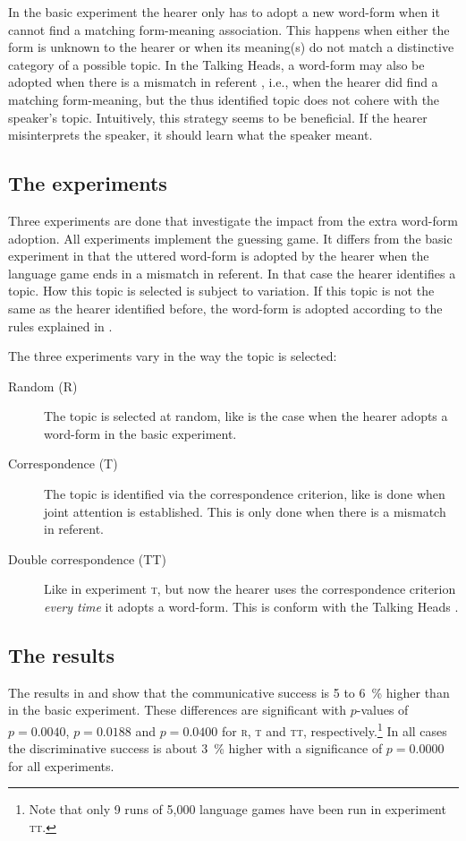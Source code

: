 In the basic experiment the hearer only has to adopt a new word-form when it cannot find a matching form-meaning association. This happens when either the form is unknown to the hearer or when its meaning(s) do not match a distinctive category of a possible topic. In the Talking Heads, a word-form may also be adopted when there is a mismatch in referent \citep{steels:2000}, i.e., when the hearer did find a matching form-meaning, but the thus identified topic does not cohere with the speaker's topic. Intuitively, this strategy seems to be beneficial. If the hearer misinterprets the speaker, it should learn what the speaker meant.

\subsection{The experiments}

Three experiments are done that investigate the impact from the extra word-form adoption. All experiments implement the guessing game. It differs from the basic experiment in that the uttered word-form is adopted by the hearer when the language game ends in a mismatch in referent. In that case the hearer identifies a topic. How this topic is selected is subject to variation. If this topic is not the same as the hearer identified before, the word-form is adopted according to the rules explained in .

The three experiments vary in the way the topic is selected:

\begin{description}
\item[Random (R)] The topic is selected at random, like is the case when the hearer adopts a word-form in the basic experiment.

\item[Correspondence (T)] The topic is identified via the correspondence criterion, like is done when joint attention is established. This is only done when there is a mismatch in referent.

\item[Double correspondence (TT)] Like in experiment {\scshape t}, but now the hearer uses the correspondence criterion {\em every time} it adopts a word-form. This is conform with the Talking Heads \citep{steels:2000}.
\end{description}

\subsection{The results}
The results in  and  show that the communicative success is 5 to 6~\% higher than in the basic experiment. These differences are significant with $p$-values of $p=0.0040$, $p=0.0188$ and $p=0.0400$ for {\scshape r}, {\scshape t} and {\scshape tt}, respectively.\footnote{Note that only 9 runs of 5,000 language games have been run in experiment {\scshape tt}.} In all cases the discriminative success is about 3~\% higher with a significance of $p=0.0000$ for all experiments.

